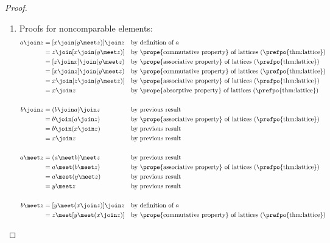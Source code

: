 \begin{proof}
\begin{enumerate}
\begin{enumerate}
      \item Proofs for noncomparable elements:
        \begin{align*}
          a \join z
            &= [x\join(y\meet z)] \join z
            && \text{by definition of $a$}
          \\&= z\join[x\join(y\meet z)]
            && \text{by \prope{commutative property} of lattices (\prefpo{thm:lattice})}
          \\&= [z\join x]\join(y\meet z)
            && \text{by \prope{associative property} of lattices (\prefpo{thm:lattice})}
          \\&= [x\join z]\join(y\meet z)
            && \text{by \prope{commutative property} of lattices (\prefpo{thm:lattice})}
          \\&= x\join [z \join(y\meet z)]
            && \text{by \prope{associative property} of lattices (\prefpo{thm:lattice})}
          \\&= x\join z
            && \text{by \prope{absorptive property} of lattices (\prefpo{thm:lattice})}
          \\
          \\
          b \join z
            &= (b\join a)\join z
            && \text{by previous result}
          \\&= b\join (a\join z)
            && \text{by \prope{associative property} of lattices (\prefpo{thm:lattice})}
          \\&= b\join (x\join z)
            && \text{by previous result}
          \\&= x\join z
            && \text{by previous result}
          \\
          \\
          a \meet z
            &= (a \meet b) \meet z
            && \text{by previous result}
          \\&= a \meet (b \meet z)
            && \text{by \prope{associative property} of lattices (\prefpo{thm:lattice})}
          \\&= a \meet (y \meet z)
            && \text{by previous result}
          \\&= y \meet z
            && \text{by previous result}
          \\
          \\
          b \meet z
            &= [y\meet(x\join z)] \join z
            && \text{by definition of $a$}
          \\&= z\meet[y\meet(x\join z)]
            && \text{by \prope{commutative property} of lattices (\prefpo{thm:lattice})}

\end{align*}
\end{enumerate}
\end{enumerate}
\end{proof}
